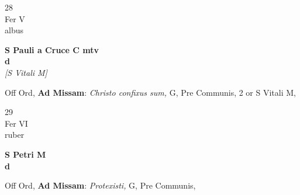 \documentclass[10pt, openany]{book}
\begin{document}
        \begin{center}
            \begin{minipage}{3.5in}
                \vspace{2em}
                \begin{minipage}{0.5in}
                    {\Huge 28} \\
                    {\normalsize Fer V} \\
                    {\normalsize albus}
                \end{minipage}
                \begin{minipage}{3.0in}
                    \textbf{ \large S Pauli a Cruce C mtv \\
                    \textnormal{\normalsize d}} \\ \textit{[S Vitali M]} \\ 
                \end{minipage}
                \begin{justify}Off Ord, \textbf{Ad Missam}: \textit{Christo confixus sum,} G, Pre Communis, 2 or S Vitali M,   
                \end{justify}
            \end{minipage}
        \end{center}
    
        \begin{center}
            \begin{minipage}{3.5in}
                \vspace{2em}
                \begin{minipage}{0.5in}
                    {\Huge 29} \\
                    {\normalsize Fer VI} \\
                    {\normalsize ruber}
                \end{minipage}
                \begin{minipage}{3.0in}
                    \textbf{ \large S Petri M \\
                    \textnormal{\normalsize d}} \\ 
                \end{minipage}
                \begin{justify}Off Ord, \textbf{Ad Missam}: \textit{Protexisti,} G, Pre Communis,   
                \end{justify}
            \end{minipage}
        \end{center}
    
\end{document}
